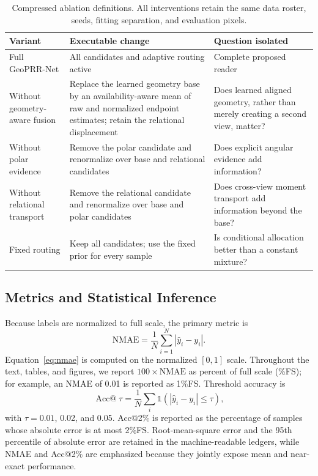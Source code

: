 \documentclass[electronics,article,submit,oneauthor]{Definitions/mdpi}
\newcommand{\modelname}{GeoPRR-Net\xspace}
\newcommand{\nmae}{\mathrm{NMAE}}
\begin{document}
\begin{table}[H]
\caption{Compressed ablation definitions. All interventions retain the same data roster, seeds, fitting separation, and evaluation pixels.}
\label{tab:ablation_definitions}
\centering
\small
\begin{tabularx}{\textwidth}{@{}>{\raggedright\arraybackslash}p{}>{\raggedright\arraybackslash}p{}X@{}}
\toprule
\textbf{Variant} & \textbf{Executable change} & \textbf{Question isolated} \\
\midrule
Full \modelname & All candidates and adaptive routing active & Complete proposed reader \\
Without geometry-aware fusion & Replace the learned geometry base by an availability-aware mean of raw and normalized endpoint estimates; retain the relational displacement & Does learned aligned geometry, rather than merely creating a second view, matter? \\
Without polar evidence & Remove the polar candidate and renormalize over base and relational candidates & Does explicit angular evidence add information? \\
Without relational transport & Remove the relational candidate and renormalize over base and polar candidates & Does cross-view moment transport add information beyond the base? \\
Fixed routing & Keep all candidates; use the fixed prior for every sample & Is conditional allocation better than a constant mixture? \\
\bottomrule
\end{tabularx}
\end{table}

\subsection{Metrics and Statistical Inference}
\label{subsec:statistics}

Because labels are normalized to full scale, the primary metric is
\begin{equation}
\nmae=\frac{1}{N}\sum_{i=1}^{N}|\widehat{y}_i-y_i|.
\label{eq:nmae}
\end{equation}
Equation~\eqref{eq:nmae} is computed on the normalized $[0,1]$ scale. Throughout the text, tables, and figures, we report $100\times\nmae$ as percent of full scale (\%FS); for example, an NMAE of 0.01 is reported as 1\%FS. Threshold accuracy is
\begin{equation}
\operatorname{Acc@}\tau=\frac{1}{N}\sum_i\mathbb{1}(|\widehat{y}_i-y_i|\leq\tau),
\label{eq:accuracy}
\end{equation}
with $\tau=0.01$, 0.02, and 0.05. Acc@2\% is reported as the percentage of samples whose absolute error is at most 2\%FS. Root-mean-square error and the 95th percentile of absolute error are retained in the machine-readable ledgers, while NMAE and Acc@2\% are emphasized because they jointly expose mean and near-exact performance.
\end{document}
